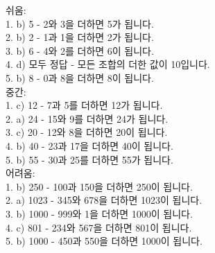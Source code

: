 \documentclass[fleqn]{article}
\begin{document}
      
          

쉬움: \\  
1. b) 5 - 2와 3을 더하면 5가 됩니다. \\  
2. b) 2 - 1과 1을 더하면 2가 됩니다. \\  
3. b) 6 - 4와 2를 더하면 6이 됩니다. \\  
4. d) 모두 정답 - 모든 조합의 더한 값이 10입니다. \\  
5. b) 8 - 0과 8을 더하면 8이 됩니다. \\  

중간: \\  
1. c) 12 - 7과 5를 더하면 12가 됩니다. \\  
2. a) 24 - 15와 9를 더하면 24가 됩니다. \\  
3. c) 20 - 12와 8을 더하면 20이 됩니다. \\  
4. b) 40 - 23과 17을 더하면 40이 됩니다. \\  
5. b) 55 - 30과 25를 더하면 55가 됩니다. \\  

어려움: \\  
1. b) 250 - 100과 150을 더하면 250이 됩니다. \\  
2. a) 1023 - 345와 678을 더하면 1023이 됩니다. \\  
3. b) 1000 - 999와 1을 더하면 1000이 됩니다. \\  
4. c) 801 - 234와 567을 더하면 801이 됩니다. \\  
5. b) 1000 - 450과 550을 더하면 1000이 됩니다. \\        
        
\end{document}

